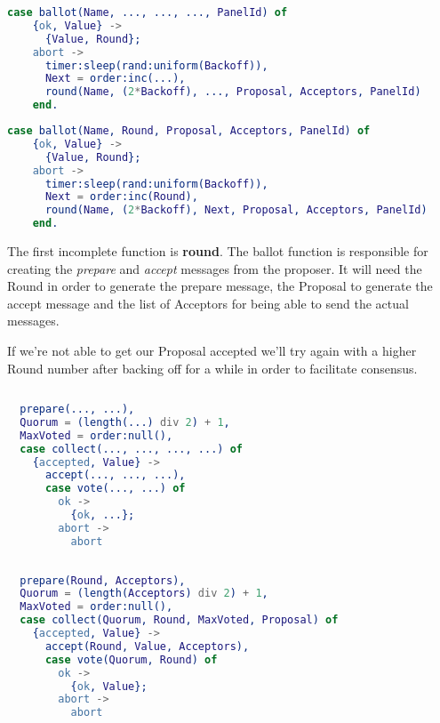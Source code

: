 \documentclass[a4paper, 10pt]{article}
\begin{document}
    \begin{minipage}{.45\textwidth}
	\begin{lstlisting}[language=erlang, caption={Template}]
	case ballot(Name, ..., ..., ..., PanelId) of  
	{ok, Value} ->
	  {Value, Round};
	abort ->
	  timer:sleep(rand:uniform(Backoff)),
	  Next = order:inc(...),
	  round(Name, (2*Backoff), ..., Proposal, Acceptors, PanelId)
	end.
	\end{lstlisting}
    \end{minipage}\hfill
    \begin{minipage}{.45\textwidth}
	\begin{lstlisting}[language=erlang, caption={Filled version}]
	case ballot(Name, Round, Proposal, Acceptors, PanelId) of
	{ok, Value} ->
	  {Value, Round};
	abort ->
	  timer:sleep(rand:uniform(Backoff)),
	  Next = order:inc(Round),
	  round(Name, (2*Backoff), Next, Proposal, Acceptors, PanelId)
	end.
	\end{lstlisting}
    \end{minipage}

    The first incomplete function is \textbf{round}. The ballot function is responsible for creating the \textit{prepare} and \textit{accept} messages from the proposer. It will need the Round in order to generate the prepare message, the Proposal to generate the accept message and the list of Acceptors for being able to send the actual messages.

    If we're not able to get our Proposal accepted we'll try again with a higher Round number after backing off for a while in order to facilitate consensus.
  

    \begin{minipage}{.45\textwidth}
	\begin{lstlisting}[language=erlang, caption={Template}]
	
  prepare(..., ...),
  Quorum = (length(...) div 2) + 1,
  MaxVoted = order:null(),
  case collect(..., ..., ..., ...) of
    {accepted, Value} ->
      accept(..., ..., ...),
      case vote(..., ...) of
        ok ->
          {ok, ...};
        abort ->
          abort
  \end{lstlisting}
    \end{minipage}\hfill
    \begin{minipage}{.45\textwidth}
	\begin{lstlisting}[language=erlang, caption={Filled version}]
	
  prepare(Round, Acceptors),
  Quorum = (length(Acceptors) div 2) + 1,
  MaxVoted = order:null(),
  case collect(Quorum, Round, MaxVoted, Proposal) of
    {accepted, Value} ->
      accept(Round, Value, Acceptors),
      case vote(Quorum, Round) of
        ok ->
          {ok, Value};
        abort ->
          abort
	\end{lstlisting}
    \end{minipage}
\end{document}
